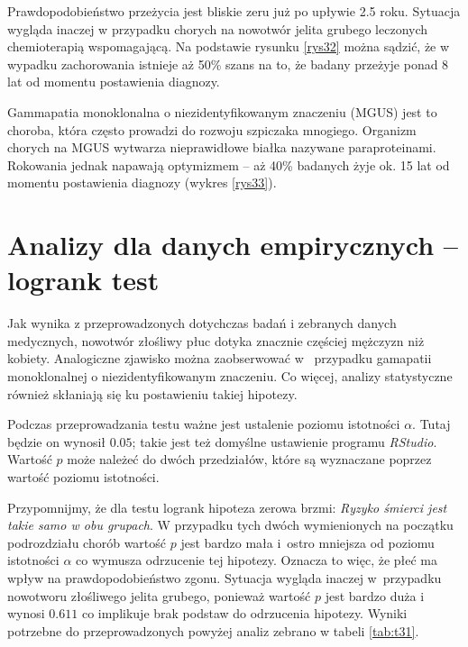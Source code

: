 \documentclass[licencjacka]{pwr_wmat_praca_dyplomowa}
\theoremstyle{plain}
\numberwithin{theorem}{chapter}
\theoremstyle{definition}
\numberwithin{theorem}{chapter}
\begin{document}
Prawdopodobieństwo przeżycia jest bliskie zeru już po upływie 2.5 roku. Sytuacja wygląda inaczej w przypadku chorych na nowotwór jelita grubego leczonych chemioterapią wspomagającą. Na podstawie rysunku \ref{rys32} można sądzić, że w wypadku zachorowania istnieje aż 50\% szans na to, że badany przeżyje ponad 8 lat od momentu postawienia diagnozy.










Gammapatia monoklonalna o niezidentyfikowanym znaczeniu (MGUS) jest to choroba, która często prowadzi do rozwoju szpiczaka mnogiego. Organizm chorych na MGUS wytwarza nieprawidłowe białka nazywane paraproteinami. Rokowania jednak napawają optymizmem -- aż 40\% badanych żyje ok. 15 lat od momentu postawienia diagnozy (wykres \ref{rys33}).



\section{Analizy dla danych empirycznych -- logrank test}
Jak wynika z przeprowadzonych dotychczas badań i zebranych danych medycznych, nowotwór złośliwy płuc dotyka znacznie częściej mężczyzn niż kobiety. Analogiczne zjawisko można zaobserwować w~
przypadku gamapatii monoklonalnej o niezidentyfikowanym znaczeniu. Co więcej, analizy statystyczne również skłaniają się ku postawieniu takiej hipotezy.



Podczas przeprowadzania testu ważne jest ustalenie poziomu istotności $\alpha$. Tutaj będzie on wynosił $0.05$; takie jest też domyślne ustawienie programu \textit{RStudio}. Wartość $p$ może należeć do dwóch przedziałów, które są wyznaczane poprzez wartość poziomu istotności.


Przypomnijmy, że dla testu logrank hipoteza zerowa brzmi: \textit{Ryzyko śmierci jest takie samo w obu grupach}. W przypadku tych dwóch wymienionych na początku podrozdziału chorób wartość $p$ jest bardzo mała i~ostro mniejsza od poziomu istotności $\alpha$ co wymusza odrzucenie tej hipotezy. Oznacza to więc, że płeć ma wpływ na prawdopodobieństwo zgonu. Sytuacja wygląda inaczej w~przypadku nowotworu złośliwego jelita grubego, ponieważ wartość $p$ jest bardzo duża i wynosi $0.611$ co implikuje brak podstaw do odrzucenia hipotezy. Wyniki potrzebne do przeprowadzonych powyżej analiz zebrano w tabeli \ref{tab:t31}.
\end{document}
